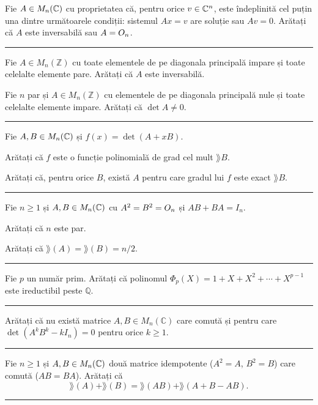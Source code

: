 Fie $A \in M_n(\mathbb{C})$ cu proprietatea că, pentru orice $v \in \mathbb{C}^n$, este îndeplinită cel puțin una dintre următoarele condiții: sistemul $Ax = v$ are soluție sau $Av = 0$. Arătați că $A$ este inversabilă sau $A = O_n$.
\vspace{1mm}\hrule

\begin{parti}
  \item Fie $A\in M_n(\mathbb{Z})$ cu toate elementele de pe diagonala principală impare și toate celelalte elemente pare. Arătați că $A$ este inversabilă.
  \item Fie $n$ par și $A\in M_n(\mathbb{Z})$ cu elementele de pe diagonala principală nule și toate celelalte elemente impare. Arătați că $\det A\neq0$.
\end{parti}
\vspace{1mm}\hrule

Fie $A,B\in M_n(\mathbb{C})$ și $f(x)=\det(A+xB)$.
\begin{parti}
  \item Arătați că $f$ este o funcție polinomială de grad cel mult $\rang B$.
  \item Arătați că, pentru orice $B$, există $A$ pentru care gradul lui $f$ este exact $\rang B$.
\end{parti}
\vspace{1mm}\hrule

Fie $n\ge1$ și $A,B\in M_n(\mathbb{C})$ cu $A^2=B^2=O_n$ și $AB+BA=I_n$.
\begin{parti}
  \item Arătați că $n$ este par.
  \item Arătați că $\rang(A)=\rang(B)=n/2$.
\end{parti}
\vspace{1mm}\hrule

Fie $p$ un număr prim. Arătați că polinomul $\Phi_p(X)=1+X+X^2+\cdots+X^{p-1}$ este ireductibil peste $\mathbb{Q}$.
\vspace{1mm}\hrule

Arătați că nu există matrice $A,B\in M_n(\mathbb{C})$ care comută și pentru care $\det(A^kB^k-kI_n)=0$ pentru orice $k\ge1$.
\vspace{1mm}\hrule

Fie $n\ge1$ și $A,B\in M_n(\mathbb{C})$ două matrice idempotente ($A^2=A$, $B^2=B$) care comută ($AB=BA$). Arătați că
\[ \rang(A)+\rang(B)=\rang(AB)+\rang(A+B-AB). \]
\vspace{1mm}\hrule

